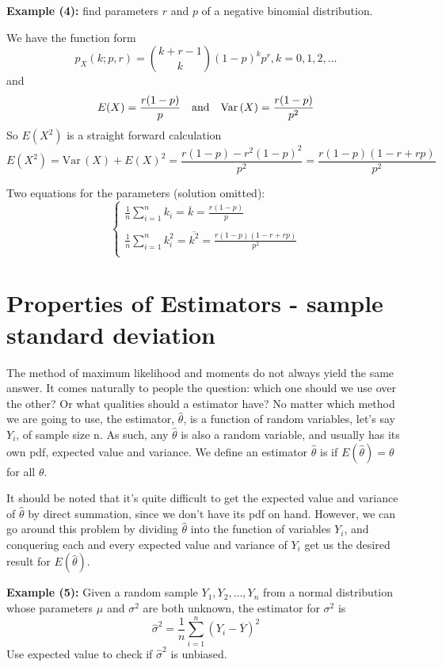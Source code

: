\documentclass[11pt]{article}
\def\Var{{\textrm{Var}}\,}
\begin{document}
  
\textbf{Example (4):} find parameters $r$ and $p$ of a negative binomial distribution.

We have the function form
\[
p_X(k; p, r) = \binom {k+r-1}{k} (1-p)^k p^r, k=0,1,2,\dots
\]
and
\[
E(X) = \frac{r(1-p)}{p} \quad \text{and} \quad \Var(X) = \frac{r(1-p)}{p^2} \\
\]
So $E(X^2)$ is a straight forward calculation
\[
E(X^2) = \Var(X) + E(X)^2 = \frac{r(1-p) - r^2 (1-p)^2}{p^2} = \frac{r(1-p)(1-r+rp)}{p^2}
\]


Two equations for the parameters (solution omitted):
\[ 
\left\{
\begin{array}{ll}
    \displaystyle \frac{1}{n} \sum _{i=1} ^n k_i = \overline{k} =  \frac{r(1-p)}{p} \\
    \hspace{5pt} \\
    \displaystyle \frac{1}{n} \sum _{i=1} ^n k_i ^2 =  \overline{k^2} =   \frac{r(1-p)(1-r+rp)}{p^2}  \\
\end{array} 
\right. 
\]


\section{\normalsize Properties of Estimators - sample standard deviation}  

The method of maximum likelihood and moments do not always yield the same answer.  It comes naturally to people the question: which one should we use over the other? Or what qualities should a  estimator have? 
No matter which method we are going to use,  the estimator, $\hat{\theta}$,  is a function of random variables, let's say $Y_i$, of sample size n.  As such,  any $\hat{\theta}$ is also a random variable,  and usually has its own pdf,  expected value and variance.  We define an estimator $\hat{\theta}$ is  if {\color{RubineRed} $E(\hat{\theta}) = \theta$} for all $\theta$.  

It should be noted that it's quite difficult to get the expected value and variance of $\hat{\theta}$ by direct summation,  since we don't have its pdf on hand.  However,  we can go around this problem by dividing $\hat{\theta}$ into the function of variables $Y_i$,  and conquering each and every expected value and variance of $Y_i$ get us the desired result for  $E (\hat{\theta})$.

\textbf{Example (5):} Given a random sample $Y_1, Y_2, \dots, Y_n$ from a normal distribution whose parameters $\mu$ and $\sigma^2$ are both unknown,  the estimator for $\sigma^2$ is
\[
\hat{\sigma}^2 = \frac{1}{n} \sum _{i=1} ^n (Y_i - \overline{Y} )^2 
\]
Use expected value to check if $\hat{\sigma}^2 $ is unbiased.
\end{document}

